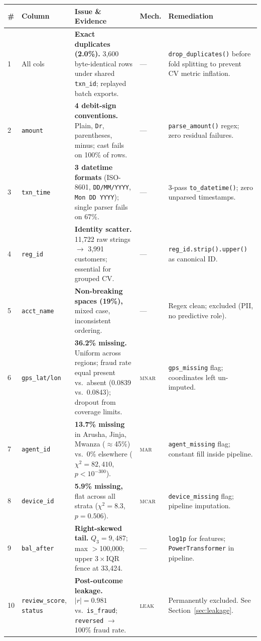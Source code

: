 \documentclass[10pt,a4paper]{article}
\newcommand{\mcar}{\textsc{mcar}}
\newcommand{\mar}{\textsc{mar}}
\newcommand{\mnar}{\textsc{mnar}}
\newcommand{\leak}{\textsc{leak}}
\begin{document}
\vspace{3pt}
{\fontsize{6.8}{8.2}\selectfont
\setlength{\tabcolsep}{3pt}
\begin{tabularx}{\textwidth}{@{}C{0.35cm} L{2.2cm} L{4.6cm} C{1.1cm} L{4.5cm}@{}}
\toprule
\textbf{\#} & \textbf{Column} & \textbf{Issue \& Evidence} &
\textbf{Mech.} & \textbf{Remediation} \\
 & All cols &
  \textbf{Exact duplicates (2.0\%).} 3,600 byte-identical rows under shared
  \texttt{txn\_id}; replayed batch exports. &
  --- &
  \texttt{drop\_duplicates()} before fold splitting to prevent CV metric
  inflation. \\
2 & \texttt{amount} &
  \textbf{4 debit-sign conventions.} Plain, \texttt{Dr}, parentheses,
  minus; cast fails on 100\% of rows. &
  --- &
  \texttt{parse\_amount()} regex; zero residual failures. \\
3 & \texttt{txn\_time} &
  \textbf{3 datetime formats} (ISO-8601, \texttt{DD/MM/YYYY},
  \texttt{Mon DD YYYY}); single parser fails on 67\%. &
  --- &
  3-pass \texttt{to\_datetime()}; zero unparsed timestamps. \\
4 & \texttt{reg\_id} &
  \textbf{Identity scatter.} 11,722 raw strings $\to$ 3,991 customers;
  essential for grouped CV. &
  --- &
  \texttt{reg\_id.strip().upper()} as canonical ID. \\
5 & \texttt{acct\_name} &
  \textbf{Non-breaking spaces (19\%),} mixed case, inconsistent ordering. &
  --- &
  Regex clean; excluded (PII, no predictive role). \\
6 & \texttt{gps\_lat/lon} &
  \textbf{36.2\% missing.} Uniform across regions; fraud rate equal present
  vs.\ absent (0.0839 vs.\ 0.0843); dropout from coverage limits. &
  \mnar &
  \texttt{gps\_missing} flag; coordinates left un-imputed. \\
7 & \texttt{agent\_id} &
  \textbf{13.7\% missing} in Arusha, Jinja, Mwanza ($\approx$45\%)
  vs.\ 0\% elsewhere ($\chi^2{=}82{,}410$, $p{<}10^{-300}$). &
  \mar &
  \texttt{agent\_missing} flag; constant fill inside pipeline. \\
8 & \texttt{device\_id} &
  \textbf{5.9\% missing,} flat across all strata
  ($\chi^2{=}8.3$, $p{=}0.506$). &
  \mcar &
  \texttt{device\_missing} flag; pipeline imputation. \\
9 & \texttt{bal\_after} &
  \textbf{Right-skewed tail.} $Q_3{=}9{,}487$; max $>$100,000;
  upper $3{\times}$IQR fence at 33,424. &
  --- &
  \texttt{log1p} for features; \texttt{PowerTransformer} in pipeline. \\
10 & \texttt{review\_score}, \texttt{status} &
  \textbf{Post-outcome leakage.} $|r|{=}0.981$ vs.\ \texttt{is\_fraud};
  \texttt{reversed} $\to$ 100\% fraud rate. &
  \leak &
  Permanently excluded. See Section~\ref{sec:leakage}. \\
\bottomrule
\end{tabularx}
}
\end{document}
